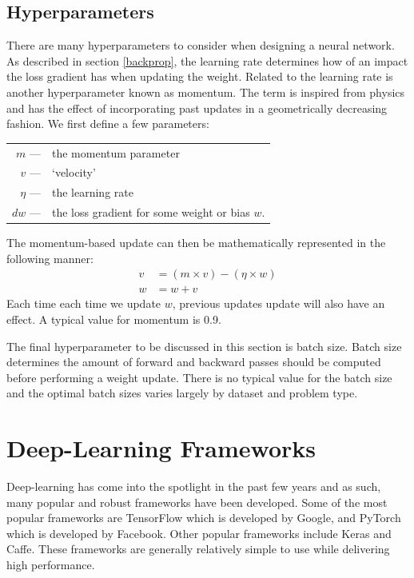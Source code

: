 \subsection{Hyperparameters}
There are many hyperparameters to consider when designing a neural network. As described in section \ref{backprop}, the learning rate determines how of an impact the loss gradient has when updating the weight. Related to the learning rate is another hyperparameter known as momentum. The term is inspired from physics and has the effect of incorporating past updates in a geometrically decreasing fashion. We first define a few parameters:
\begin{center}
	\begin{tabular} {r l}
		$m$  \hspace{12pt}---& the momentum parameter\\ 
		$v$  \hspace{12pt}---& `velocity' \\
		$\eta$ \hspace{12pt}---& the learning rate \\
		$dw$ \hspace{12pt}---& the loss gradient for some weight or bias $w$. 
	\end{tabular}
\end{center}The momentum-based update can then be mathematically represented in the following manner:
\begin{align*}
v &=  (m \times v) - (\eta \times w) \\
w &= w + v 
\end{align*}
Each time each time we update $w$, previous updates update will also have an effect. A typical value for momentum is 0.9.

The final hyperparameter to be discussed in this section is batch size. Batch size determines the amount of forward and backward passes should be computed before performing a weight update. There is no typical value for the batch size and the optimal batch sizes varies largely by dataset and problem type.

\section{Deep-Learning Frameworks}
Deep-learning has come into the spotlight in the past few years and as such, many popular and robust frameworks have been developed. Some of the most popular frameworks are TensorFlow which is developed by Google, and PyTorch which is developed by Facebook. Other popular frameworks include Keras and Caffe. These frameworks are generally relatively simple to use while delivering high performance. 


